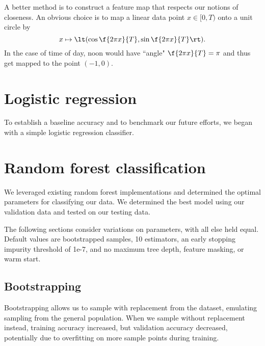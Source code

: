 \documentclass{article}
\begin{document}
\begin{multicols}{2}
A better method is to construct a feature map
that respects our notions of closeness.
An obvious choice is to map a linear data point $x \in [0, T)$
onto a unit circle by
\begin{equation}
    x \mapsto \lt(\cos\f{2\pi x}{T}, \sin\f{2\pi x}{T}\rt).
\end{equation}
In the case of time of day,
noon would have ``angle" $\f{2\pi x}{T} = \pi$
and thus get mapped to the point $(-1, 0)$.


\section{Logistic regression}

To establish a baseline accuracy
and to benchmark our future efforts,
we began with a simple logistic regression classifier.


\section{Random forest classification}

We leveraged existing random forest implementations
and determined the optimal parameters for classifying our data.
We determined the best model using our validation data
and tested on our testing data.

The following sections consider variations on parameters,
with all else held equal.
Default values are bootstrapped samples,
10 estimators, an early stopping impurity threshold of 1e-7,
and no maximum tree depth,
feature masking, or warm start.

\subsection{Bootstrapping}

Bootstrapping allows us to sample with replacement
from the dataset,
emulating sampling from the general population.
When we sample without replacement instead,
training accuracy increased,
but validation accuracy decreased,
potentially due to overfitting on more sample points during training.


\end{multicols}
\end{document}
